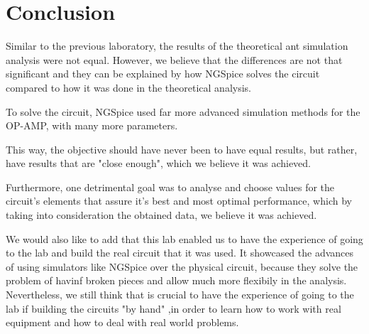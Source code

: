 \section{Conclusion}
\label{sec:conclusion}

\indent

Similar to the previous laboratory, the results of the theoretical ant simulation analysis were not equal.
However, we believe that the differences are not that significant and they can be explained by how NGSpice solves the circuit compared to how it was done in the theoretical analysis.

To solve the circuit, NGSpice used far more advanced simulation methods for the OP-AMP, with many more parameters. 

This way, the objective should have never been to have equal results, but rather, have results that are "close enough", which we believe it was achieved.

Furthermore, one detrimental goal was to analyse and choose values for the circuit's elements that assure it's best and most optimal performance, which by taking into consideration the obtained data, we believe it was achieved.

We would also like to add that this lab enabled us to have the experience of going to the lab and build the real circuit that it was used. It showcased the advances of using simulators like NGSpice over the physical circuit, because they solve the problem of havinf broken pieces and allow much more flexibily in the analysis. Nevertheless, we still think that is crucial to have the experience of going to the lab if building the circuits "by hand" ,in order to learn how to work with real equipment and how to deal with real world problems. 

